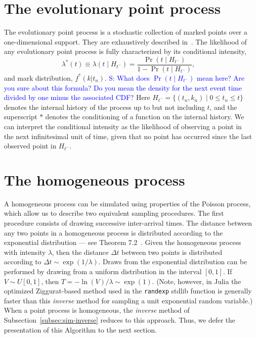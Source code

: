 \documentclass{juliacon}
\newcommand{\comment}[1]{\textcolor{blue}{#1}}
\begin{document}
\section{The evolutionary point process} \label{sec:notation}

The evolutionary point process is a stochastic collection of marked points over a one-dimensional support. They are exhaustively described in~\cite{daley2003}. The likelihood of any evolutionary point process is fully characterized by its conditional intensity,
\[
  \lambda^\ast (t) \equiv \lambda(t \mid H_{t^-} ) = \frac{\Pr(t \mid H_{t^-})}{1 - \Pr(t \mid H_{t^-})},
\]
and mark distribution, $f^*(k | t_n)$. \comment{S: What does $\Pr(t \mid H_{t^-})$ mean here? Are you sure about this formula? Do you mean the density for the next event time divided by one minus the associated CDF?} Here \( H_{t^-} = \{ (t_n, k_n) \mid 0 \leq t_n \leq t \} \) denotes the internal history of the process up to but not including \( t \), and the superscript \( \ast \) denotes the conditioning of a function on the internal history. We can interpret the conditional intensity as the likelihood of observing a point in the next infinitesimal unit of time, given that no point has occurred since the last observed point in \( H_{t^-} \).


\section{The homogeneous process} \label{sec:method-poisson}

A homogeneous process can be simulated using properties of the Poisson process, which allow us to describe two equivalent sampling procedures. The first procedure consists of drawing successive inter-arrival times. The distance between any two points in a homogeneous process is distributed according to the exponential distribution --- see Theorem 7.2~\cite{last2017}. Given the homogeneous process with intensity $\lambda$, then the distance \( \Delta t \) between two points is distributed according to $\Delta t \sim \exp(1/\lambda)$. Draws from the exponential distribution can be performed by drawing from a uniform distribution in the interval $[0, 1]$. If $V \sim U[0, 1]$, then \( T = - \ln(V) / \lambda \sim \exp(1) \). (Note, however, in Julia the optimized Ziggurat-based method used in the \texttt{randexp} stdlib function is generally faster than this \textit{inverse} method for sampling a unit exponential random variable.) When a point process is homogeneous, the \textit{inverse} method of Subsection~\ref{subsec:sim-inverse} reduces to this approach. Thus, we defer the presentation of this Algorithm to the next section.
\end{document}
